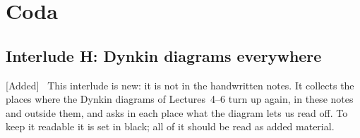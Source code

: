 \documentclass[11pt,openany]{book}
\theoremstyle{plain}
\theoremstyle{definition}
\theoremstyle{remark}
\newenvironment{addedblock}{\par\color{addcol}\noindent\textsf{\small[Added]}\ }{\par}
\begin{document}
\part*{Coda}
\begingroup\renewcommand{\thechapter}{H}\renewcommand{\theHchapter}{interludeH}


\chapter[Interlude H: Dynkin diagrams everywhere]{Interlude H: Dynkin diagrams everywhere}
\label{DYN:ch}

\begin{addedblock}
This interlude is new: it is not in the handwritten notes. It collects the places where the Dynkin
diagrams of Lectures~4--6 turn up again, in these notes and outside them, and asks in each place what
the diagram lets us read off. To keep it readable it is set in black; all of it should be read as
added material.
\end{addedblock}
\end{document}
